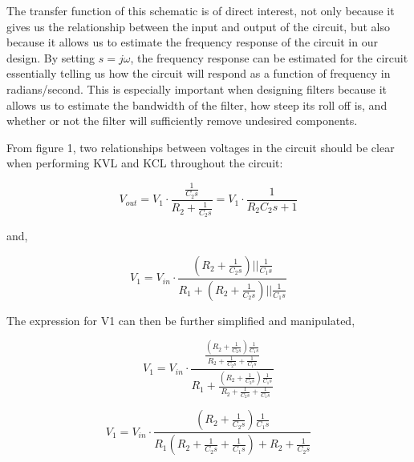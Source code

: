 \documentclass{letter}
\begin{document}
\begin{flushleft}
    The transfer function of this schematic is of 
    direct interest, not only because it gives us the relationship between the input and output of the circuit, but also because it allows us to estimate the frequency response of the circuit in our design. 
    By setting $s=j \omega$, the frequency response can be estimated for the circuit essentially telling us how the circuit will
    respond as a function of frequency in radians/second. This is especially important when designing filters because it allows us
    to estimate the bandwidth of the filter, how steep its roll off is, and whether or not the filter will sufficiently remove 
    undesired components. 
    
    From figure 1, two relationships between voltages in the circuit should be clear when performing KVL and KCL throughout the circuit:

    \[ V_{out} =V_{1} \cdot   \frac{\frac{1}{C_{2}s}}{R_{2} + \frac{1}{C_{2}s}} = V_{1} \cdot \frac{1}{R_{2}C_{2}s +1} \]

    and,

   \[V_{1} = V_{in} \cdot \frac{(R_{2} + \frac{1}{C_{2}s})||\frac{1}{C_{1}s}}{R_{1} + (R_{2} + \frac{1}{C_{2}s})||\frac{1}{C_{1}s}}\] 

   The expression for V1 can then be further simplified and manipulated,

   \[V_{1} = V_{in} \cdot \frac{\frac{(R_{2} + \frac{1}{C_{2}s})\frac{1}{C_{1}s}}{R_{2} + \frac{1}{C_{2}s} + \frac{1}{C_{1}s}}}{R_{1} + \frac{(R_{2} + \frac{1}{C_{2}s})\frac{1}{C_{1}s}}{R_{2} + \frac{1}{C_{2}s} + \frac{1}{C_{1}s}}} \]


   \[V_{1} = V_{in} \cdot \frac{(R_{2} + \frac{1}{C_{2}s})\frac{1}{C_{1}s}}{R_{1}(R_{2} + \frac{1}{C_{2}s} + \frac{1}{C_{1}s}) + R_{2} + \frac{1}{C_{2}s}}\]



\end{flushleft}
 
\end{document}
